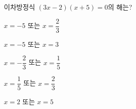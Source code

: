이차방정식 $(3x-2)(x+5)=0$의 해는?
\begin{choicesii}{\rule[-3ex]{0pt}{8ex}$x=-5$ 또는 $x=\dfrac{2}{3}$}{\rule[-3ex]{0pt}{8ex}$x=-5$ 또는 $x=3$}{\rule[-3ex]{0pt}{8ex}$x=-\dfrac{2}{3}$ 또는 $x=\dfrac{1}{5}$}{\rule[-3ex]{0pt}{8ex}$x=\dfrac{1}{5}$ 또는 $x=\dfrac{2}{3}$}{\rule[-3ex]{0pt}{8ex}$x=2$ 또는 $x=5$}\end{choicesii}
